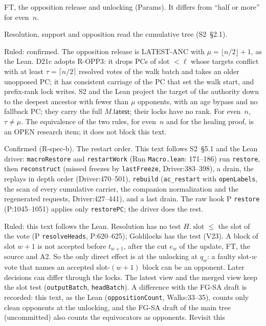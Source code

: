 \documentclass{article}
\newcommand{\slot}{\operatorname{slot}}
\newcommand{\nm}[1]{\nolinkurl{#1}}
\begin{document}
\begin{description}
  FT, the opposition release and unlocking (Params).  It differs from
  ``half or more'' for even~$n$.
\item[S38] Resolution, support and opposition read the cumulative tree
  (S2~\S2.1).
\item[S39] Ruled: confirmed.  The opposition release is LATEST-ANC with
  $\mu=\lfloor n/2\rfloor+1$, as the Lean.  D21c adopts R-OPP3: it drops
  PCs of slot $<\ell$ whose targets conflict with at least
  $\tau=\lceil n/2\rceil$ resolved votes of the walk batch and takes an
  older unopposed PC; it has consistent carriage of the PC that set the
  walk start, and prefix-rank lock writes.  S2 and the Lean project the
  target of the authority down to the deepest ancestor with fewer than
  $\mu$ opponents, with an age bypass and no fallback PC; they carry the
  full $M.\mathsf{latest}$; their locks have no rank.  For even~$n$,
  $\tau\neq\mu$.  The equivalence of the two rules, for even~$n$ and for
  the healing proof, is an OPEN research item; it does not block this
  text.
\item[S40] Confirmed (R-spec-b).  The restart order.  This text follows S2~\S5.1 and the Lean
  driver: \nm{macroRestore} and \nm{restartWork} (Run \nm{Macro.lean}:
  171--186) run \nm{restore}, then \nm{reconstruct} (missed freezes by
  \nm{lastFreeze}, Driver:383--398), a drain, the replays in depth order
  (Driver:470--501), \nm{rebuild} (\nm{ac\_restart} with
  \nm{openLabels}, the scan of every cumulative carrier, the companion
  normalization and the regenerated requests, Driver:427--441), and a last
  drain.  The raw hook P \nm{restore} (P:1045--1051) applies only
  \nm{restorePC}; the driver does the rest.
\item[S41] Ruled: this text follows the Lean.  Resolution has no test
  $H.\slot\leq$ the slot of the vote (P \nm{resolveHeads}, P:620--625);
  Goldilocks has the test (V23).  A block of slot $w+1$ is not accepted
  before $t_{w+1}$, after the cut $e_w$ of the update, FT, the source and
  A2.  So the only direct effect is at the unlocking at $q_w$: a faulty
  slot-$w$ vote that names an accepted slot-$(w+1)$ block can be an
  opponent.  Later decisions can differ through the locks.  The latest
  view and the merged view keep the slot test (\nm{outputBatch},
  \nm{headBatch}).  A difference with the FG-SA draft is recorded: this
  text, as the Lean (\nm{oppositionCount}, Walks:33--35), counts only clean
  opponents at the unlocking, and the FG-SA draft of the main tree
  (uncommitted) also counts the equivocators as opponents.  Revisit this

\end{description}
\end{document}

